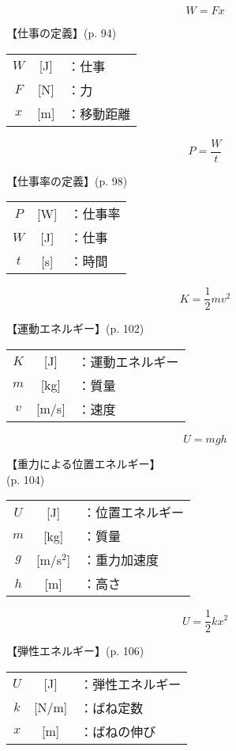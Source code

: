 \documentclass[10pt]{jarticle}
\begin{document}
\newpage
\[
	W = F x
\]


\vskip3mm
【仕事の定義】{\footnotesize (p. 94)}

\begin{tabular}{ccl}
$W$	&[J]	&：仕事\\
$F$	&[N]	&：力\\
$x$	&[m]	&：移動距離
\end{tabular}





\newpage
\[
	P = \frac{W}{t}
\]


\vskip3mm
【仕事率の定義】{\footnotesize (p. 98)}

\begin{tabular}{ccl}
$P$	&[W]	&：仕事率\\
$W$	&[J]	&：仕事\\
$t$	&[s]	&：時間
\end{tabular}




\newpage
\[
	K = \frac{1}{2} m v^2
\]


\vskip3mm
【運動エネルギー】{\footnotesize (p. 102)}

\begin{tabular}{ccl}
$K$	&[J]	&：運動エネルギー\\
$m$	&[kg]	&：質量\\
$v$	&[m/s]	&：速度
\end{tabular}





\newpage
\[
	U = mgh
\]


\vskip3mm
【重力による位置エネルギー】\\
\hfill{\footnotesize (p. 104)}

\begin{tabular}{ccl}
$U$	&[J]	&：位置エネルギー\\
$m$	&[kg]	&：質量\\
$g$	&[m/s$^2$]	&：重力加速度\\
$h$	&[m]	&：高さ
\end{tabular}





\newpage
\[
	U = \frac{1}{2} kx^2
\]


\vskip3mm
【弾性エネルギー】{\footnotesize (p. 106)}

\begin{tabular}{ccl}
$U$	&[J]	&：弾性エネルギー\\
$k$	&[N/m]	&：ばね定数\\
$x$	&[m]	&：ばねの伸び
\end{tabular}
\end{document}
